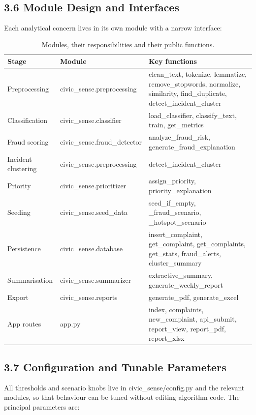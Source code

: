 \documentclass[10pt,letterpaper,oneside]{article}\usepackage{geometry}\geometry{top=1in,bottom=1in,left=1in,right=1in,includeheadfoot}\usepackage{xcolor}\definecolor{color@navy}{HTML}{1F3B63}\definecolor{color@grey}{HTML}{404040}\definecolor{color@hdr}{HTML}{F2F4F7}\usepackage{titlesec}\titleformat{\section}  {\normalfont\huge\bfseries\color@navy}  {}{0pt}{\MakeUppercase}\titleformat{\subsection}  {\normalfont\Large\bfseries\color@navy}  {}{0pt}{}\titleformat{\subsubsection}  {\normalfont\large\bfseries\color@navy}  {}{0pt}{}\titlespacing*{\section}{0pt}{14pt}{6pt}\titlespacing*{\subsection}{0pt}{10pt}{4pt}\titlespacing*{\subsubsection}{0pt}{8pt}{3pt}\setlength{\parindent}{0pt}\setlength{\parskip}{0.6em}\parindent=0pt\usepackage{enumitem}\setlist{nosep,leftmargin=*,itemsep=0pt,topsep=2pt,partopsep=0pt}\usepackage{array}\usepackage{booktabs}\usepackage{caption}\captionsetup{font={small,it},labelfont={bf},labelsep=period,  parskip=2pt,skip=4pt,list=no}\captionsetup[table]{labelfont={bf,small,color@navy},name=Table}\usepackage{graphicx}\usepackage{verbatim}\usepackage{ragged2e}\usepackage{longtable}\usepackage{tabularx}\usepackage{multirow}\usepackage{colortbl}\definecolor{rowshade}{HTML}{F2F4F7}\usepackage{tikz}\usetikzlibrary{positioning,calc}\usepackage[hidelinks]{hyperref}\hypersetup{colorlinks=true,linkcolor=color@navy,urlcolor=color@navy}\pagestyle{fancy}\fancyhf{}\renewcommand{\headrulewidth}{0.4pt}\fancyhead[L]{\small\color@navy CivicSense — Project Report}\fancyhead[R]{\small\color@grey October 11, 2026}\fancyfoot[C]{\small\color@grey An Integrated Intelligent Triage Pipelin}\fancyfoot[R]{\small\color@grey Page \thepage}\usepackage{setspace}\setstretch{1.15}\AtBeginDocument{  \hypersetup{pdftitle={An Integrated Intelligent Triage Pipeline for AI-Enhanced Citizen Complaint Management},    pdfauthor={CivicSense Project Team},    pdfsubject={Project Report},    pdfkeywords={smart cities, NLP, complaint management, e-governance},    pdfcreator={CivicSense Project Team}  }}
\begin{document}
\subsection*{3.6 Module Design and Interfaces}
Each analytical concern lives in its own module with a narrow interface:

\begin{table}[htbp]
\centering
\small
\begin{tabular}{@{}lll@{}}
\toprule
Stage & Module & Key functions \\
\midrule
Preprocessing & civic\_sense.preprocessing & clean\_text, tokenize, lemmatize, remove\_stopwords, normalize, similarity, find\_duplicate, detect\_incident\_cluster \\
Classification & civic\_sense.classifier & load\_classifier, classify\_text, train, get\_metrics \\
Fraud scoring & civic\_sense.fraud\_detector & analyze\_fraud\_risk, generate\_fraud\_explanation \\
Incident clustering & civic\_sense.preprocessing & detect\_incident\_cluster \\
Priority & civic\_sense.prioritizer & assign\_priority, priority\_explanation \\
Seeding & civic\_sense.seed\_data & seed\_if\_empty, \_fraud\_scenario, \_hotspot\_scenario \\
Persistence & civic\_sense.database & insert\_complaint, get\_complaint, get\_complaints, get\_stats, fraud\_alerts, cluster\_summary \\
Summarisation & civic\_sense.summarizer & extractive\_summary, generate\_weekly\_report \\
Export & civic\_sense.reports & generate\_pdf, generate\_excel \\
App routes & app.py & index, complaints, new\_complaint, api\_submit, report\_view, report\_pdf, report\_xlsx \\
\bottomrule
\end{tabular}
\caption{Modules, their responsibilities and their public functions.}
\end{table}

\subsection*{3.7 Configuration and Tunable Parameters}
All thresholds and scenario knobs live in civic_sense/config.py and the relevant modules, so that behaviour can be tuned without editing algorithm code. The principal parameters are:
\end{document}
